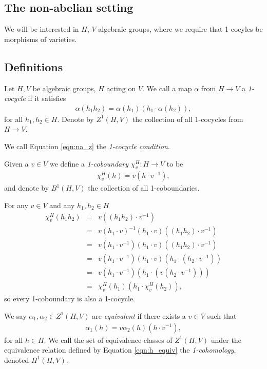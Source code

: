\subsection{The non-abelian setting}

We will be interested in $H$, $V$ algebraic groups, where we require that 1-cocyles be morphisms of varieties. 

\subsection{Definitions}
Let $H, V$ be algebraic groups, $H$ acting on $V$. We call a map $\alpha$ from $H\rightarrow V$ a  \emph{1-cocycle} if it satisfies
\begin{eqnarray}
  \alpha(h_1h_2) = \alpha(h_1) (h_1\cdot\alpha(h_2)),
  \label{eqn:na_z}
\end{eqnarray}
for all $h_1, h_2 \in H$. Denote by $Z^1\left( H, V \right)$ the collection of all 1-cocycles from $H\rightarrow V$.

We call Equation \ref{eqn:na_z} the \emph{1-cocycle condition}.

Given a $v \in V$ we define a \emph{1-coboundary} $\chi^H_v:H\rightarrow V$ to be
\begin{eqnarray*}
	\chi^H_v (h) = v (h\cdot v^{-1}),
\end{eqnarray*}
and denote by $B^1\left(H, V\right)$ the collection of all 1-coboundaries. 

For any $v \in V$ and any $h_1, h_2 \in H$
\begin{eqnarray*}
	\chi^H_v(h_1h_2) &=& v ((h_1h_2) \cdot v^{-1}) \\
	&=& v (h_1 \cdot v)^{-1} (h_1 \cdot v) ((h_1h_2) \cdot v^{-1}) \\
	&=& v (h_1 \cdot v^{-1}) (h_1 \cdot v) ((h_1h_2) \cdot v^{-1}) \\
	&=& v (h_1 \cdot v^{-1}) (h_1 \cdot v) (h_1 \cdot (h_2 \cdot v^{-1})) \\
	&=& v (h_1 \cdot v^{-1}) (h_1 \cdot (v (h_2 \cdot v^{-1}))) \\
	&=& \chi^H_v(h_1) (h_1 \cdot \chi^H_v(h_2)),
\end{eqnarray*}
so every 1-coboundary is also a 1-cocycle. 

We say $\alpha_1, \alpha_2 \in Z^1(H, V)$ are \emph{equivalent} if there exists a $v \in V$ such that
\begin{eqnarray}
  \alpha_1(h) = v \alpha_2(h) (h \cdot v^{-1}),
  \label{eqn:h_equiv}
\end{eqnarray}
for all $h \in H$. We call the set of equivalence classes of $Z^1(H, V)$ under the equivalence relation defined by Equation \ref{eqn:h_equiv} the \emph{1-cohomology}, denoted $H^1(H, V)$.

